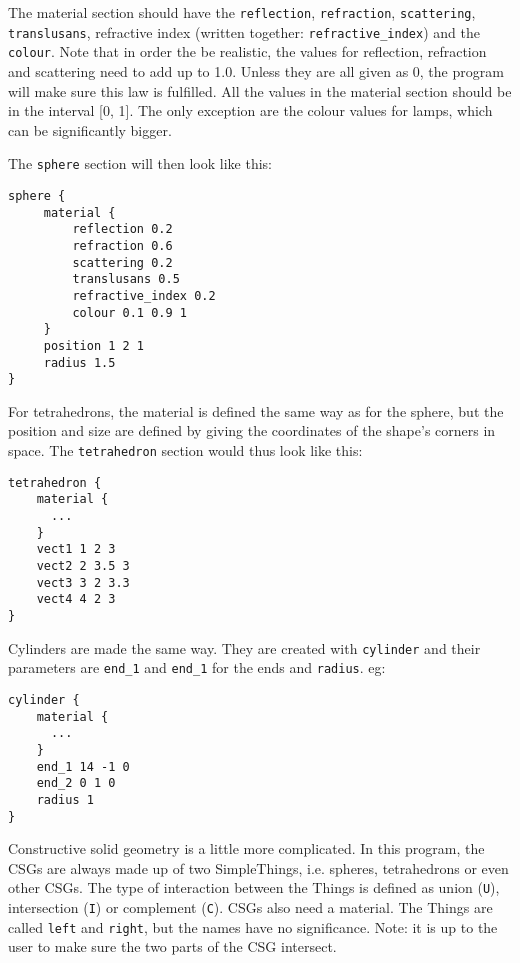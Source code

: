 The material section should have the \texttt{reflection}, \texttt{refraction}, \texttt{scattering}, \texttt{translusans}, refractive index (written together: \texttt{refractive\_index}) and the \texttt{colour}. Note that in order the be realistic, the values for reflection, refraction and scattering need to add up to 1.0. Unless they are all given as 0, the program will make sure this law is fulfilled. All the values in the material section should be in the interval [0, 1]. The only exception are the colour values for lamps, which can be significantly bigger.

The \texttt{sphere} section will then look like this:

\begin{verbatim}
sphere {
     material {
         reflection 0.2
         refraction 0.6
         scattering 0.2
         translusans 0.5
         refractive_index 0.2
         colour 0.1 0.9 1
     }
     position 1 2 1
     radius 1.5
}
\end{verbatim}

For tetrahedrons, the material is defined the same way as for the sphere, but the position and size are defined by giving the coordinates of the shape's corners in space. The \texttt{tetrahedron} section would thus look like this: 

\begin{verbatim}
tetrahedron {
    material {
      ...
    }
    vect1 1 2 3
    vect2 2 3.5 3
    vect3 3 2 3.3
    vect4 4 2 3
}
\end{verbatim}

Cylinders are made the same way. They are created with \texttt{cylinder} and their parameters are \texttt{end\_1} and \texttt{end\_1} for the ends and \texttt{radius}. eg:

\begin{verbatim}
cylinder {
    material {
      ...
    }
    end_1 14 -1 0
    end_2 0 1 0
    radius 1
}
\end{verbatim}

Constructive solid geometry is a little more complicated. In this program, the CSGs are always made up of two SimpleThings, i.e. spheres, tetrahedrons or even other CSGs. The type of interaction between the Things is defined as union (\texttt{U}), intersection (\texttt{I}) or complement (\texttt{C}). CSGs also need a material. The Things are called \texttt{left} and \texttt{right}, but the names have no significance. Note: it is up to the user to make sure the two parts of the CSG intersect.

